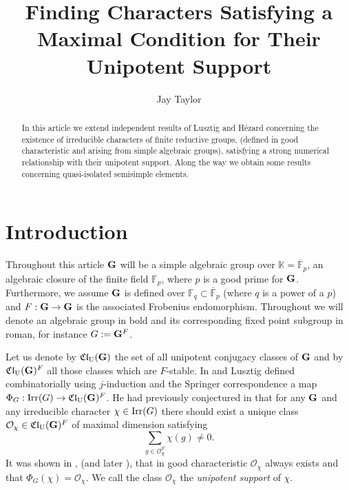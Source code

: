 \documentclass[eqthmnum]{jt-calcs}
\title{Finding Characters Satisfying a Maximal Condition for Their Unipotent Support}
\author{Jay Taylor}
\newcommand{\Clu}{\ensuremath{\mathfrak{Cl}_{\mathrm{U}}}}
\begin{document}
\start
\begin{abstract}
In this article we extend independent results of Lusztig and H\'{e}zard concerning the existence of irreducible characters of finite reductive groups, (defined in good characteristic and arising from simple algebraic groups), satisfying a strong numerical relationship with their unipotent support. Along the way we obtain some results concerning quasi-isolated semisimple elements.
\end{abstract}

\section{Introduction}
Throughout this article $\mathbf{G}$ will be a simple algebraic group over $\mathbb{K} = \overline{\mathbb{F}}_p$, an algebraic closure of the finite field $\mathbb{F}_p$, where $p$ is a good prime for $\mathbf{G}$. Furthermore, we assume $\mathbf{G}$ is defined over $\mathbb{F}_q \subset \overline{\mathbb{F}}_p$ (where $q$ is a power of a $p$) and $F:\mathbf{G}\to \mathbf{G}$ is the associated Frobenius endomorphism. Throughout we will denote an algebraic group in bold and its corresponding fixed point subgroup in roman, for instance $G := \mathbf{G}^F$.

Let us denote by $\Clu(\bG)$\index{CluG@$\Clu(\bG)$} the set of all unipotent conjugacy classes of $\mathbf{G}$ and by $\Clu(\bG)^F$\index{CluGF@$\Clu(\bG)^F$} all those classes which are $F$-stable. In \cite[\S13.4]{lusztig:1984:characters-of-reductive-groups} and \cite[\S10]{lusztig:1992:a-unipotent-support} Lusztig defined combinatorially using $j$-induction and the Springer correspondence a map $\Phi_G : \Irr(G) \to \Clu(\bG)^F$. He had previously conjectured in \cite{lusztig:1980:some-problems-in-the-representation-theory} that for any $\mathbf{G}$ and any irreducible character $\chi \in \operatorname{Irr}(G)$ there should exist a unique class $\mathcal{O}_{\chi} \in \Clu(\bG)^F$ of maximal dimension satisfying
\begin{equation*}
\sum_{g \in \mathcal{O}_{\chi}^F} \chi(g) \neq 0.
\end{equation*}
It was shown in \cite{lusztig:1992:a-unipotent-support}, (and later \cite{geck:1996:on-the-average-values}), that in good characteristic $\mathcal{O}_{\chi}$ always exists and that $\Phi_G(\chi) = \mathcal{O}_{\chi}$. We call the class $\mathcal{O}_{\chi}$ the \emph{unipotent support} of $\chi$.
\end{document}
